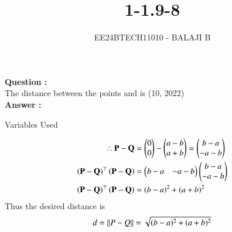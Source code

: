 \documentclass[journal]{IEEEtran}
\begin{document}

\vspace{3cm}

\title{1-1.9-8}
\author{EE24BTECH11010 - BALAJI B
}
{\let\newpage\relax\maketitle}

\renewcommand{\thefigure}{\theenumi}
\renewcommand{\thetable}{\theenumi}
\setlength{\intextsep}{10pt} %


\renewcommand{\thetable}{\theenumi}

\textbf{Question :} \\ 
The distance between the points  and  is  \hfill(10, 2022) \\

\textbf{Answer :} \\

\begin{table}[h!]    
  \centering
  
  \caption{Variables Used}
  \label{tab1.9.19.1}
\end{table}

\begin{align}
    \therefore\mathbf{P} - \mathbf{Q} &= \begin{pmatrix}0 \\ 0 \end{pmatrix} - \begin{pmatrix}a - b \\ a + b\end{pmatrix} = \begin{pmatrix}b - a \\ -a -b\end{pmatrix} \\
    \left(\mathbf{P - Q}\right)^\top \left(\mathbf{P - Q}\right) &= \begin{pmatrix}b-a & -a-b\end{pmatrix}\begin{pmatrix}b-a \\ -a-b\end{pmatrix} \\
    \left(\mathbf{P - Q}\right)^\top \left(\mathbf{P - Q}\right) &= (b - a)^2 + (a + b)^2
\end{align} 
Thus the desired distance is \\

\begin{align}
    d = \left\lVert P - Q\right\rVert = \sqrt{(b - a)^2 + (a + b)^2}
\end{align}
\end{document}
